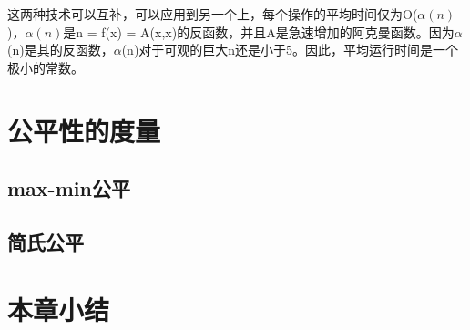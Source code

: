这两种技术可以互补，可以应用到另一个上，每个操作的平均时间仅为O($\alpha(n)$)，$\alpha(n)$是n = f(x) = A(x,x)的反函数，并且A是急速增加的阿克曼函数。因为$\alpha$(n)是其的反函数，$\alpha$(n)对于可观的巨大n还是小于5。因此，平均运行时间是一个极小的常数。

\section{公平性的度量}
\subsection{max-min公平}
\subsection{简氏公平}
\section{本章小结}
